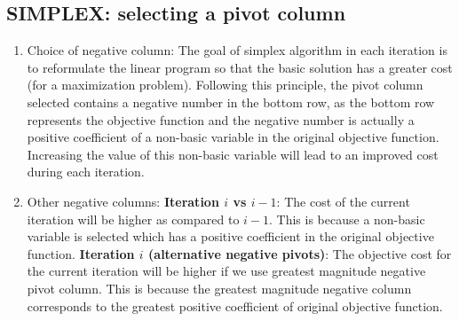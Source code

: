 \documentclass{acm_proc_article-sp}
\begin{document}
\subsection{SIMPLEX: selecting a pivot column}

\begin{enumerate}
  \item Choice of negative column: The goal of simplex algorithm in each iteration
    is to reformulate the linear program so that the basic solution has a greater
    cost (for a maximization problem). Following this principle, the pivot column
    selected contains a negative number in the bottom row, as the bottom row
    represents the objective function and the negative number is actually a positive
    coefficient of a non-basic variable in the original objective function.
    Increasing the value of this non-basic variable will lead to an improved cost
    during each iteration.
  \item Other negative columns:
    {\bf Iteration $i$ vs $i-1$}: The cost of the current iteration will be higher as compared
    to $i-1$. This is because a non-basic variable is selected which has a
    positive coefficient in the original objective function.
    {\bf Iteration $i$ (alternative negative pivots)}: The objective cost for the
    current iteration will be higher if we use greatest magnitude negative pivot
    column. This is because the greatest magnitude negative column corresponds to
    the greatest positive coefficient of original objective function.
\end{enumerate}



\end{document}
